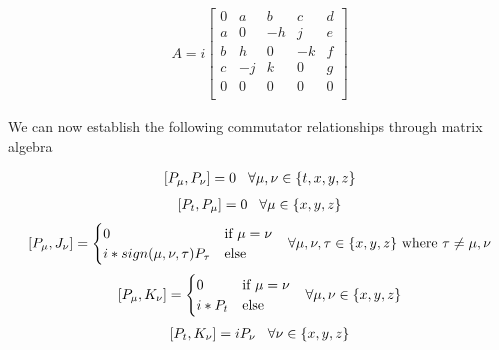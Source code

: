 \documentclass[10pt]{ucthesis}
\begin{document}
\begin{equation}
\begin{aligned}A=i
	\begin{bmatrix}
		0 & a & b & c & d\\
		a & 0 & -h & j & e\\
		b & h & 0 & -k & f\\
		c & -j & k & 0 & g\\
		0 & 0 & 0 & 0 & 0\\
	\end{bmatrix}
\end{aligned}
\end{equation}

We can now establish the following commutator relationships through matrix algebra

\begin{equation}
\begin{aligned}
	[P_\mu,P_\nu] = 0 \hspace{3mm} \forall \mu,\nu\in\{t,x,y,z\}
\end{aligned}
\end{equation}
\begin{equation}
\begin{aligned}
	[P_t,P_\mu] = 0 \hspace{3mm} \forall \mu\in\{x,y,z\}
\end{aligned}
\end{equation}
\begin{equation}
\begin{aligned}
	[P_\mu,J_\nu] = \begin{cases}
							0 &\text{if } \mu=\nu \\
							i*sign(\mu,\nu,\tau)P_\tau & \text{else}
						\end{cases} \hspace{3mm} \forall \mu,\nu,\tau\in\{x,y,z\}\text{ where }\tau \neq\mu,\nu
\end{aligned}
\end{equation}
\begin{equation}
\begin{aligned}
	[P_\mu,K_\nu] = \begin{cases}
							0 &\text{if } \mu=\nu \\
							i*P_t & \text{else}
						\end{cases} \hspace{3mm} \forall \mu,\nu\in\{x,y,z\}
\end{aligned}
\end{equation}
\begin{equation}
\begin{aligned}
	[P_t,K_\nu] = iP_\nu \hspace{3mm} \forall\nu\in\{x,y,z\}
\end{aligned}
\end{equation}
\end{document}

